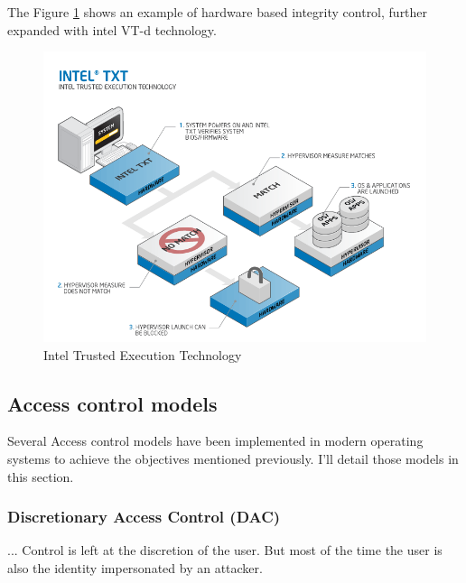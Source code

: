 \documentclass[pdftex,a4paper,titlepage,11pt]{article}
\begin{document}
\bigskip

The Figure \ref{INTELTXT} shows an example of hardware based integrity control, further expanded with intel VT-d technology.

\begin{figure}[h]
	\centering
	\includegraphics[scale=0.70]{techrefresh-info-txtfull.png}
	\caption{Intel Trusted Execution Technology}
	\label{INTELTXT}
\end{figure}

\subsection{Access control models}

Several Access control models have been implemented in modern operating systems to achieve the objectives mentioned previously. I'll detail those models in this section.


\subsubsection{Discretionary Access Control (DAC)}

... Control is left at the discretion of the user. But most of the time the user is also the identity impersonated by an attacker.
\end{document}
